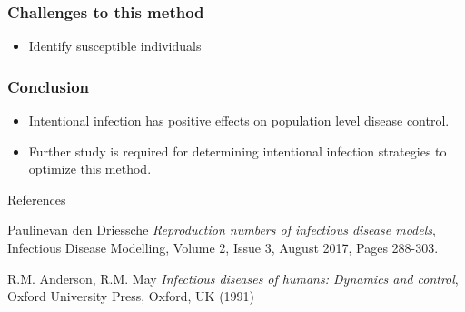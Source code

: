 \documentclass[12pt]{beamer}
\begin{document}
\begin{frame}
\frametitle{Challenges to this method}
\begin{itemize}
\item Identify susceptible individuals
\end{itemize}
\end{frame}
\begin{frame}
\frametitle{Conclusion}
\begin{itemize}\itemsep10pt
\item Intentional infection has positive effects on population level disease control.
\item Further study is required for determining intentional infection strategies to optimize this method.
\end{itemize}
\end{frame}
\begin{frame}{References}
\begin{thebibliography}{9}
Paulinevan den Driessche \emph{Reproduction numbers of infectious disease models}, Infectious Disease Modelling, Volume 2, Issue 3, August 2017, Pages 288-303.

R.M. Anderson, R.M. May
\emph{Infectious diseases of humans: Dynamics and control}, Oxford University Press, Oxford, UK (1991)
\end{thebibliography}
\end{frame}
\end{document}

